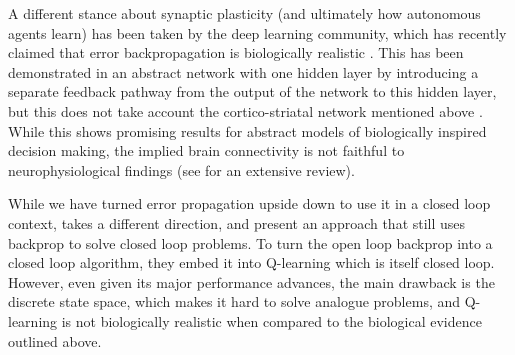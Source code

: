 \documentclass{article}
\begin{document}
A different stance about synaptic plasticity (and ultimately how
autonomous agents learn) has been taken by the deep learning
community, which has recently claimed that error backpropagation is
biologically realistic \cite{Lillicrap2016,Roelfsema2018}. This has
been demonstrated in an abstract network with one hidden layer by
introducing a separate feedback pathway from the output of the network
to this hidden layer, but this does not take account the
cortico-striatal network mentioned above \cite{haber95}. While this
shows promising results for abstract models of biologically inspired
decision making, the implied brain connectivity is not faithful to
neurophysiological findings (see \cite{berthoud04} for an extensive
review).

While we have turned error propagation upside down to use it in a
closed loop context, \cite{Guo2014} takes a different direction, and
present an approach that still uses backprop to solve closed loop
problems. To turn the open loop backprop into a closed loop algorithm,
they embed it into Q-learning which is itself closed loop. However,
even given its major performance advances, the main drawback is the
discrete state space, which makes it hard to solve analogue problems,
and Q-learning is not biologically realistic when compared to the
biological evidence outlined above.




\end{document}
